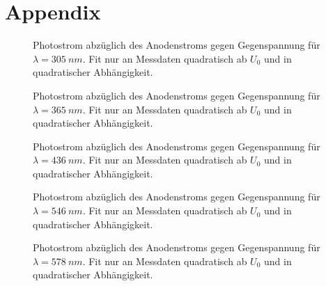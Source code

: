 \documentclass[sn-mathphys-num,iicol]{sn-jnl}
\theoremstyle{thmstyleone}
\theoremstyle{thmstyletwo}
\theoremstyle{thmstylethree}
\begin{document}
\section{Appendix}
\begin{figure}[t]
        \centering
        \resizebox{.5\textwidth}{!}{}
        \caption{Photostrom abzüglich des Anodenstroms gegen Gegenspannung für $\lambda =\SI{305}{n m}$. Fit nur an Messdaten quadratisch ab $U_0$ und in quadratischer Abhängigkeit.} \label{fig:photo_auswertung_305}
\end{figure}
\begin{figure}[t]
        \centering
        \resizebox{.5\textwidth}{!}{}
        \caption{Photostrom abzüglich des Anodenstroms gegen Gegenspannung für $\lambda =\SI{365}{n m}$. Fit nur an Messdaten quadratisch ab $U_0$ und in quadratischer Abhängigkeit.}
\end{figure}
\begin{figure}[t]
        \centering
        \resizebox{.5\textwidth}{!}{}
        \caption{Photostrom abzüglich des Anodenstroms gegen Gegenspannung für $\lambda =\SI{436}{n m}$. Fit nur an Messdaten quadratisch ab $U_0$ und in quadratischer Abhängigkeit.}
\end{figure}
\begin{figure}[]
        \centering
        \resizebox{.5\textwidth}{!}{}
        \caption{Photostrom abzüglich des Anodenstroms gegen Gegenspannung für $\lambda =\SI{546}{n m}$. Fit nur an Messdaten quadratisch ab $U_0$ und in quadratischer Abhängigkeit.}
\end{figure}
\begin{figure}[]
        \centering
        \resizebox{.5\textwidth}{!}{}
        \caption{Photostrom abzüglich des Anodenstroms gegen Gegenspannung für $\lambda =\SI{578}{n m}$. Fit nur an Messdaten quadratisch ab $U_0$ und in quadratischer Abhängigkeit.} \label{fig:photo_auswertung_578}
\end{figure}


\end{document}
